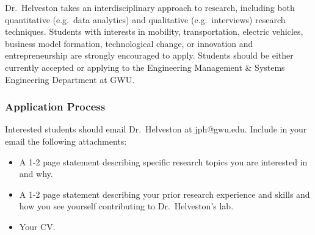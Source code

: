 \documentclass[
  12pt,
  letterpaper,
  DIV=11,
  numbers=noendperiod]{scrartcl}
\providecommand{\tightlist}{%
  \setlength{\itemsep}{0pt}\setlength{\parskip}{0pt}}\usepackage{longtable,booktabs,array}
\begin{document}
Dr.~Helveston takes an interdisciplinary approach to research, including
both quantitative (e.g.~data analytics) and qualitative
(e.g.~interviews) research techniques. Students with interests in
mobility, transportation, electric vehicles, business model formation,
technological change, or innovation and entrepreneurship are strongly
encouraged to apply. Students should be either currently accepted or
applying to the Engineering Management \& Systems Engineering Department
at GWU.

\hypertarget{application-process}{%
\subsubsection{Application Process}\label{application-process}}

Interested students should email Dr.~Helveston at jph@gwu.edu. Include
in your email the following attachments:

\begin{itemize}
\tightlist
\item
  A 1-2 page statement describing specific research topics you are
  interested in and why.
\item
  A 1-2 page statement describing your prior research experience and
  skills and how you see yourself contributing to Dr.~Helveston's lab.
\item
  Your CV.
\end{itemize}
\end{document}
